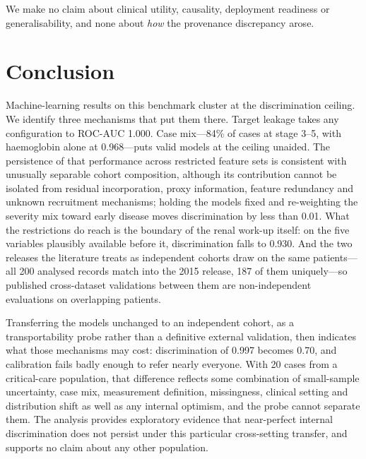 \documentclass[conference]{IEEEtran}
\begin{document}
We make no claim about clinical utility, causality, deployment readiness or
generalisability, and none about \emph{how} the provenance discrepancy arose.

\section{Conclusion}

Machine-learning results on this benchmark cluster at the discrimination
ceiling. We identify three mechanisms that put them there. Target leakage
takes any configuration to ROC-AUC 1.000. Case mix---84\% of cases at stage
3--5, with haemoglobin alone at 0.968---puts valid models at the ceiling
unaided. The persistence of that performance across restricted feature sets
is consistent with unusually separable cohort composition, although its
contribution cannot be isolated from residual incorporation, proxy
information, feature redundancy and unknown recruitment mechanisms; holding
the models fixed and re-weighting the severity mix toward early disease
moves discrimination by less than 0.01. What the restrictions do reach is
the boundary of the renal work-up itself: on the five variables plausibly
available before it, discrimination falls to 0.930. And the two releases the
literature treats as
independent cohorts draw on the same patients---all 200 analysed records
match into the 2015 release, 187 of them uniquely---so published
cross-dataset validations between them are non-independent evaluations on
overlapping patients.

Transferring the models unchanged to an independent cohort, as a
transportability probe rather than a definitive external validation, then
indicates what those mechanisms may cost: discrimination of 0.997 becomes
0.70, and calibration fails badly enough to refer nearly everyone. With 20
cases from a critical-care population, that difference reflects some
combination of small-sample uncertainty, case mix, measurement definition,
missingness, clinical setting and distribution shift as well as any internal
optimism, and the probe cannot separate them. The analysis provides
exploratory evidence that near-perfect internal discrimination does not
persist under this particular cross-setting transfer, and supports no
claim about any other population.
\end{document}
